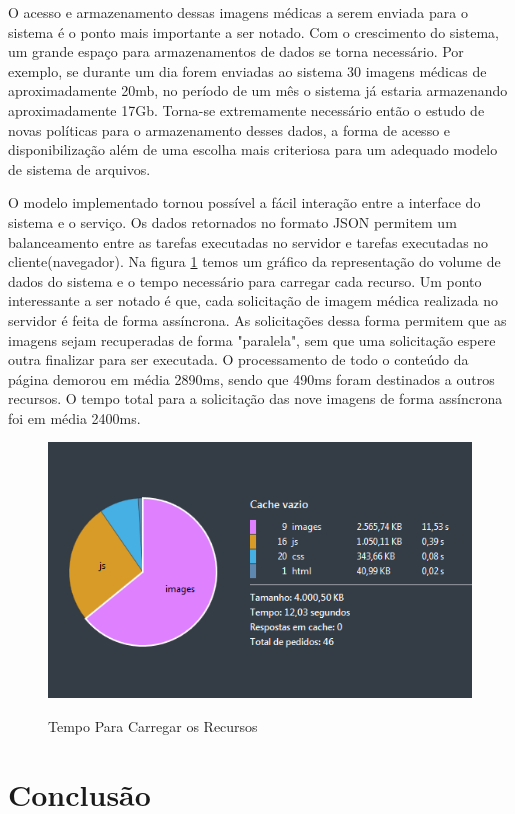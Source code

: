 O acesso e armazenamento dessas imagens médicas a serem enviada para o sistema é o ponto mais importante a ser notado. Com o crescimento do sistema, um grande espaço para armazenamentos de dados se torna necessário. Por exemplo, se durante um dia forem enviadas ao sistema 30 imagens médicas de aproximadamente 20mb, no período de um mês o sistema já estaria armazenando aproximadamente 17Gb. Torna-se extremamente necessário então o estudo de novas políticas para o armazenamento desses dados, a forma de acesso e disponibilização além de uma escolha mais criteriosa para um adequado modelo de sistema de arquivos.

O modelo implementado tornou possível a fácil interação entre a interface do sistema e o serviço. Os dados retornados no formato JSON permitem um balanceamento entre as tarefas executadas no servidor e tarefas executadas no cliente(navegador). Na figura \ref{fig:figura5} temos um gráfico da representação do volume de dados do sistema e o tempo necessário para carregar cada recurso. Um ponto interessante a ser notado é que, cada solicitação de imagem médica realizada no servidor é feita de forma assíncrona. As solicitações dessa forma permitem que as imagens sejam recuperadas de forma "paralela", sem que uma solicitação espere outra finalizar para ser executada. O processamento de todo o conteúdo da página demorou em média 2890ms, sendo que 490ms foram destinados a outros recursos. O tempo total para a solicitação das nove imagens de forma assíncrona foi em média 2400ms.


\begin{figure}[ht]
	\centering	
	\caption[\hspace{0.1cm}Imagens Clínicas.]{Tempo Para Carregar os Recursos}
	\vspace{-0.4cm}
	\includegraphics[width=1.0\textwidth]{figuras/analiseTempoIndividualParaCarregarImagens.png}
	\vspace{-0.2cm}
	\label{fig:figura5}
\end{figure}

\section{\esp Conclusão}



% 
